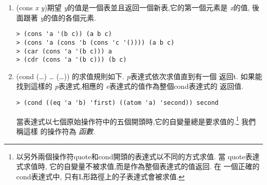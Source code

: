 \documentclass[12pt,a4]{article}
\begin{document}
\begin{CJK}{UTF8}{bsmi}
\begin{enumerate}
{x}的第一個元素之後的所有元素. 
\begin{verbatim} 
> (cdr '(a b c)) (b c) 
\end{verbatim} 
\item 
(cons 
{\it 
x} 
{\it 
y})期望{\it 
y}的值是一個表並且返回一個新表,它的第一個元素是{\it 
x}的值, 
後 
面跟著{\it 
y}的值的各個元素. 
\begin{verbatim} 
> (cons 'a '(b c)) (a b c) 
> (cons 'a (cons 'b (cons 'c '()))) (a b c) 
> (car (cons 'a '(b c))) a 
> (cdr (cons 'a '(b c))) (b c) 
\end{verbatim} 
\item 
(cond 
(\pone\dots\eone) 
\dots 
(\pn\dots\en)) 
的求值規則如下. 
{\it 
p}表達式依次求值直到有一個 
返回t. 
如果能找到這樣的{\it 
p}表達式,相應的{\it 
e}表達式的值作為整個cond表達式的 
返回值. 
\begin{verbatim} 
> (cond ((eq 'a 'b) 'first) ((atom 'a) 'second)) second 
\end{verbatim} 
當表達式以七個原始操作符中的五個開頭時,它的自變量總是要求值的.\footnote{以另外兩個操作符quote和cond開頭的表達式以不同的方式求值. 
當 
quote表達式求值時, 
它的自變量不被求值,而是作為整個表達式的值返回. 
在 
一個正確的cond表達式中, 
只有L形路徑上的子表達式會被求值.} 
我們稱這樣 
的操作符為{\em 
函數}. 
\end{enumerate} 

\end{CJK}
\end{document}
